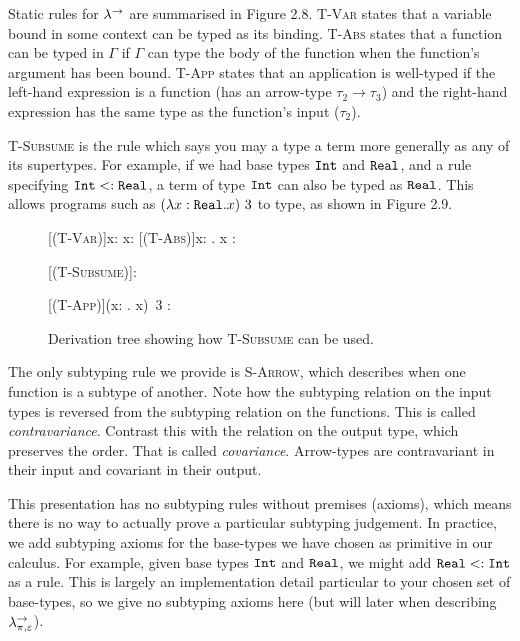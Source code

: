 Static rules for $\lambda^{\rightarrow}$ are summarised in Figure 2.8. \textsc{T-Var} states that a variable bound in some context can be typed as its binding. \textsc{T-Abs} states that a function can be typed in $\Gamma$ if $\Gamma$ can type the body of the function when the function's argument has been bound. \textsc{T-App} states that an application is well-typed if the left-hand expression is a function (has an arrow-type $\tau_2 \rightarrow \tau_3$) and the right-hand expression has the same type as the function's input ($\tau_2$).

\textsc{T-Subsume} is the rule which says you may a type a term more generally as any of its supertypes. For example, if we had base types $\mathtt{Int}$ and $\mathtt{Real}$, and a rule specifying $\mathtt{Int} <: \mathtt{Real}$, a term of type $\mathtt{Int}$ can also be typed as $\mathtt{Real}$. This allows programs such as $(\lambda x: \mathtt{Real}. x)~3$ to type, as shown in Figure 2.9.

\begin{figure}[h]


    \begin{prooftree*}
        [\textsc{(T-Var)}]{x: \Real \vdash x: \Real}
        [\textsc{(T-Abs)}]{\vdash \lambda x: \Real . x : \Real \rightarrow \Real }
        
        \Hypo{\Int <: \Real}
        [\textsc{(T-Subsume)}]{: \Real}
        
        [\textsc{(T-App)}]{\vdash (\lambda x: \Real . x)~3 : \Real}
 	\end{prooftree*}
 	
\vspace{-12pt}
\caption{Derivation tree showing how \textsc{T-Subsume} can be used.}
\label{This is the label.}
\end{figure}
 


The only subtyping rule we provide is \textsc{S-Arrow}, which describes when one function is a subtype of another. Note how the subtyping relation on the input types is reversed from the subtyping relation on the functions. This is called \textit{contravariance}. Contrast this with the relation on the output type, which preserves the order. That is called \textit{covariance}. Arrow-types are contravariant in their input and covariant in their output.

This presentation has no subtyping rules without premises (axioms), which means there is no way to actually prove a particular subtyping judgement. In practice, we add subtyping axioms for the base-types we have chosen as primitive in our calculus. For example, given base types $\mathtt{Int}$ and $\mathtt{Real}$, we might add $\mathtt{Real} <: \mathtt{Int}$ as a rule. This is largely an implementation detail particular to your chosen set of base-types, so we give no subtyping axioms here (but will later when describing $\lambda^{\rightarrow}_{\pi, \varepsilon}$).

